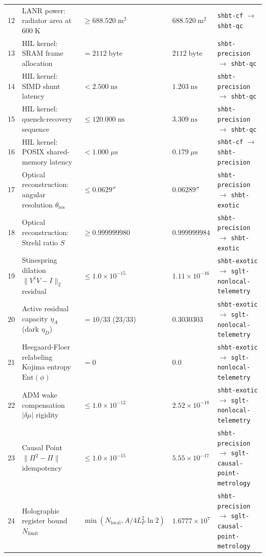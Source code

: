 \documentclass[10pt,twocolumn]{IEEEtran}
\begin{document}
\begin{table}[t]
\begin{tabular}{@{}cp{4.3cm}p{3.5cm}p{3.3cm}p{3.6cm}@{}}
12 & LANR power: radiator area at $600\;\mathrm{K}$ & $\geq688.520\;\mathrm{m^2}$ & $688.520\;\mathrm{m^2}$ & \texttt{shbt-cf} $\rightarrow$ \texttt{shbt-qc} \\
13 & HIL kernel: SRAM frame allocation & $=2112\;\mathrm{byte}$ & $2112\;\mathrm{byte}$ & \texttt{shbt-precision} $\rightarrow$ \texttt{shbt-qc} \\
14 & HIL kernel: SIMD shunt latency & $<2.500\;\mathrm{ns}$ & $1.203\;\mathrm{ns}$ & \texttt{shbt-precision} $\rightarrow$ \texttt{shbt-qc} \\
15 & HIL kernel: quench-recovery sequence & $\leq120.000\;\mathrm{ns}$ & $3.309\;\mathrm{ns}$ & \texttt{shbt-precision} $\rightarrow$ \texttt{shbt-qc} \\
16 & HIL kernel: POSIX shared-memory latency & $<1.000\;\mu\mathrm{s}$ & $0.179\;\mu\mathrm{s}$ & \texttt{shbt-cf} $\rightarrow$ \texttt{shbt-precision} \\
17 & Optical reconstruction: angular resolution $\theta_{\mathrm{res}}$ & $\leq0.0629''$ & $0.06289''$ & \texttt{shbt-precision} $\rightarrow$ \texttt{shbt-exotic} \\
18 & Optical reconstruction: Strehl ratio $S$ & $\geq0.999999980$ & $0.999999984$ & \texttt{shbt-precision} $\rightarrow$ \texttt{shbt-exotic} \\
\midrule
19 & Stinespring dilation $\|V^\dagger V-I\|_2$ residual & $\leq1.0\times10^{-15}$ & $1.11\times10^{-16}$ & \texttt{shbt-exotic} $\rightarrow$ \texttt{sglt-nonlocal-telemetry} \\
20 & Active residual capacity $\eta_A$ (dark $\eta_D$) & $=10/33$ ($23/33$) & $0.3030303$ & \texttt{shbt-exotic} $\rightarrow$ \texttt{sglt-nonlocal-telemetry} \\
21 & Heegaard-Floer relabeling Kojima entropy $\mathrm{Ent}(\phi)$ & $=0$ & $0.0$ & \texttt{shbt-exotic} $\rightarrow$ \texttt{sglt-nonlocal-telemetry} \\
22 & ADM wake compensation $|\delta\mu|$ rigidity & $\leq1.0\times10^{-12}$ & $2.52\times10^{-18}$ & \texttt{shbt-exotic} $\rightarrow$ \texttt{sglt-nonlocal-telemetry} \\
23 & Causal Point $\|\Pi^2-\Pi\|$ idempotency & $\leq1.0\times10^{-15}$ & $5.55\times10^{-17}$ & \texttt{shbt-precision} $\rightarrow$ \texttt{sglt-causal-point-metrology} \\
24 & Holographic register bound $N_{\mathrm{limit}}$ & $\min(N_{\mathrm{local}}, A/4L_P^2\ln2)$ & $1.6777\times10^{7}$ & \texttt{shbt-precision} $\rightarrow$ \texttt{sglt-causal-point-metrology} \\

\end{tabular}
\end{table}
\end{document}
